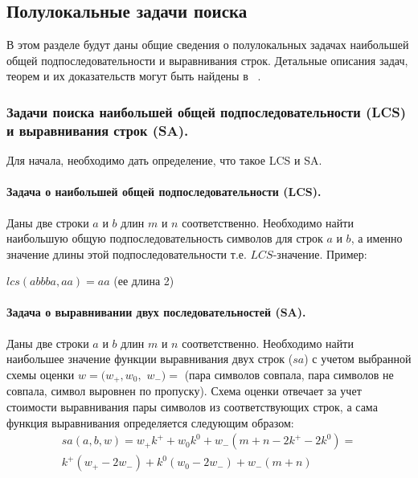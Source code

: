 

\subsection{Полулокальные задачи поиска}

В этом разделе будут даны общие сведения о полулокальных задачах наибольшей общей подпоследовательности и выравнивания строк.
Детальные описания задач, теорем и их доказательств могут быть найдены в ~\cite{alex2007semilocal}.

\subsubsection{Задачи поиска наибольшей общей подпоследовательности (LCS) и выравнивания строк (SA).}

Для начала, необходимо дать определение, что такое {LCS} и {SA}.

\paragraph*{Задача о наибольшей общей подпоследовательности (LCS).}

Даны две строки $a$ и $b$ длин $m$ и $n$ соответственно.
Необходимо найти наибольшую общую подпоследовательность
 символов для строк $a$ и $b$, а именно значение длины этой подпоследовательности т.е. $LCS$-значение.
Пример:
\begin{center}
    $lcs(abbba,aa)=aa$ (ее длина 2)
\end{center}
 
\paragraph*{Задача о выравнивании двух последовательностей (SA).}

Даны две строки $a$ и $b$ длин $m$ и $n$ соответственно.
Необходимо найти наибольшее  значение функции выравнивания двух строк ($sa$) с учетом выбранной схемы оценки $w = (w_{+}, w_{0} ,$ $w_{-})=$ (пара символов совпала, пара символов не совпала, символ выровнен по пропуску).
Схема оценки отвечает за учет стоимости выравнивания пары символов из соответствующих строк, а сама функция выравнивания определяется следующим образом:
\begin{equation}\label{formula:sa}
\begin{aligned}
    sa(a,b,w) = w_{+}k^{+} + w_{0}k^{0} + w_{-} (m + n - 2k^{+} - 2k^{0}) =\\
    k^{+} (w_{+} - 2w_{-} ) + k^{0}  (w_{0} - 2w_{-}) + w_{-}(m + n)
\end{aligned}
\end{equation}


